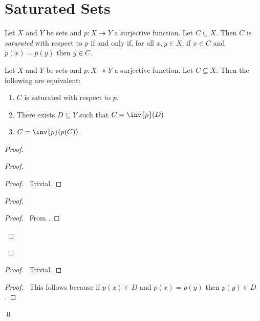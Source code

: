 \section{Saturated Sets}

\begin{definition}
    Let $X$ and $Y$ be sets and $p : X \twoheadrightarrow Y$ a surjective function. Let $C \subseteq X$. Then $C$ is \emph{saturated} with respect to $p$ if and only if, for all
    $x, y \in X$, if $x \in C$ and $p(x) = p(y)$ then $y \in C$.
\end{definition}

\begin{proposition}
    \label{proposition:saturated}
    Let $X$ and $Y$ be sets and $p : X \twoheadrightarrow Y$ a surjective function. Let $C \subseteq X$. Then the following are equivalent:
    \begin{enumerate}
        \item $C$ is saturated with respect to $p$.
        \item There exists $D \subseteq Y$ such that $C = \inv{p}(D)$
        \item $C = \inv{p}(p(C))$.
    \end{enumerate}
\end{proposition}

\begin{proof}
    \pf
    \begin{proof}
        \begin{proof}
            \pf\ Trivial.
        \end{proof}
        \begin{proof}
            \begin{proof}
                \pf\ From .
            \end{proof}
        \end{proof}
    \end{proof}
    \begin{proof}
        \pf\ Trivial.
    \end{proof}
    \begin{proof}
        \pf\ This follows because if $p(x) \in D$ and $p(x) = p(y)$ then $p(y) \in D$.
    \end{proof}
    \qed
\end{proof}

